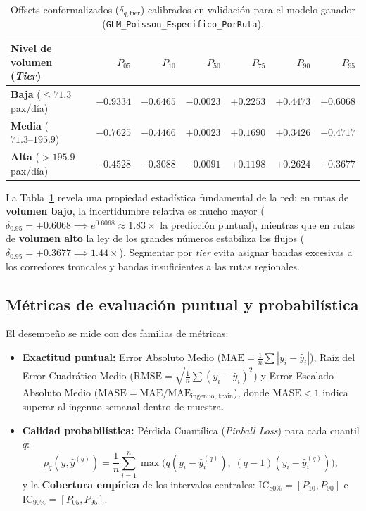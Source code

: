 \documentclass[11pt,a4paper]{article}
\begin{document}
\begin{table}[H]
\centering
\caption{Offsets conformalizados ($\delta_{q, \text{tier}}$) calibrados en validación para el modelo ganador (\texttt{GLM\_Poisson\_Especifico\_PorRuta}).}
\label{tab:offsets}
\begin{tabular}{lrrrrrr}
\toprule
\textbf{Nivel de volumen (\textit{Tier})} & $P_{05}$ & $P_{10}$ & $P_{50}$ & $P_{75}$ & $P_{90}$ & $P_{95}$ \\
\midrule
\textbf{Baja} ($\le 71.3$ pax/día)    & $-0.9334$ & $-0.6465$ & $-0.0023$ & $+0.2253$ & $+0.4473$ & $+0.6068$ \\
\textbf{Media} ($71.3\text{--}195.9$) & $-0.7625$ & $-0.4466$ & $+0.0023$ & $+0.1690$ & $+0.3426$ & $+0.4717$ \\
\textbf{Alta} ($> 195.9$ pax/día)     & $-0.4528$ & $-0.3088$ & $-0.0091$ & $+0.1198$ & $+0.2624$ & $+0.3677$ \\
\bottomrule
\end{tabular}
\end{table}

La Tabla~\ref{tab:offsets} revela una propiedad estadística fundamental de la red: en rutas de \textbf{volumen bajo}, la incertidumbre relativa es mucho mayor ($\delta_{0.95} = +0.6068 \implies e^{0.6068} \approx 1.83\times$ la predicción puntual), mientras que en rutas de \textbf{volumen alto} la ley de los grandes números estabiliza los flujos ($\delta_{0.95} = +0.3677 \implies 1.44\times$). Segmentar por \textit{tier} evita asignar bandas excesivas a los corredores troncales y bandas insuficientes a las rutas regionales.

\subsection{Métricas de evaluación puntual y probabilística}

El desempeño se mide con dos familias de métricas:
\begin{itemize}[leftmargin=1.5em]
    \item \textbf{Exactitud puntual:} Error Absoluto Medio ($\text{MAE} = \frac{1}{n}\sum |y_i - \hat{y}_i|$), Raíz del Error Cuadrático Medio ($\text{RMSE} = \sqrt{\frac{1}{n}\sum (y_i - \hat{y}_i)^2}$) y Error Escalado Absoluto Medio ($\text{MASE} = \text{MAE} / \text{MAE}_{\text{ingenuo, train}}$), donde $\text{MASE} < 1$ indica superar al ingenuo semanal dentro de muestra.
    \item \textbf{Calidad probabilística:} Pérdida Cuantílica (\textit{Pinball Loss}) para cada cuantil $q$:
    \[
    \rho_q(y, \hat{y}^{(q)}) = \frac{1}{n}\sum_{i=1}^{n} \max\!\Big(q(y_i - \hat{y}^{(q)}_i),\; (q - 1)(y_i - \hat{y}^{(q)}_i)\Big),
    \]
    y la \textbf{Cobertura empírica} de los intervalos centrales: $\text{IC}_{80\%} = [P_{10}, P_{90}]$ e $\text{IC}_{90\%} = [P_{05}, P_{95}]$.
\end{itemize}
\end{document}
